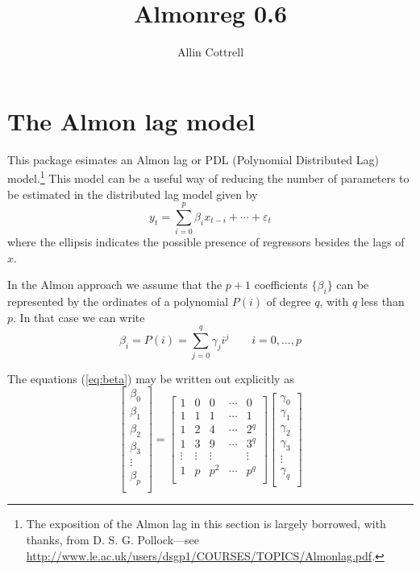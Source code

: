 \documentclass{article}
\begin{document}
\setlength{\parindent}{0pt}
\setlength{\parskip}{1ex}

\title{Almonreg 0.6}
\author{Allin Cottrell}
\maketitle

\section{The Almon lag model}

This package esimates an Almon lag or PDL (Polynomial Distributed Lag)
model.\footnote{The exposition of the Almon lag in this section is
  largely borrowed, with thanks, from D. S. G. Pollock---see
  \url{http://www.le.ac.uk/users/dsgp1/COURSES/TOPICS/Almonlag.pdf}.}
This model can be a useful way of reducing the number of parameters to
be estimated in the distributed lag model given by
%
\begin{equation}
\label{eq:dl}
y_t = \sum_{i=0}^p \beta_i x_{t-i} + \cdots + \varepsilon_t
\end{equation}
%
where the ellipsis indicates the possible presence of regressors
besides the lags of $x$.

In the Almon approach we assume that the $p+1$ coefficients
$\{\beta_i\}$ can be represented by the ordinates of a polynomial
$P(i)$ of degree $q$, with $q$ less than $p$. In that case we can
write
%
\begin{equation}
\label{eq:beta}
\beta_i = P(i) = \sum_{j=0}^q \gamma_j i^j \qquad i=0,\dots,p
\end{equation}

The equations (\ref{eq:beta}) may be written out explicitly as
%
\begin{equation*}
\left[
\begin{array}{c}
\beta_0 \\
\beta_1 \\
\beta_2 \\
\beta_3 \\
\vdots \\
\beta_p \\
\end{array}
\right]
=
\left[
  \begin{array}{ccccc}
1 & 0 & 0 & \cdots & 0 \\
1 & 1 & 1 & \cdots & 1 \\
1 & 2 & 4 & \cdots & 2^q \\
1 & 3 & 9 & \cdots & 3^q \\
\vdots & \vdots & \vdots & & \vdots \\
1 & p & p^2 & \cdots & p^q \\
\end{array}
\right]
\left[
\begin{array}{c}
\gamma_0 \\
\gamma_1 \\
\gamma_2 \\
\gamma_3 \\
\vdots \\
\gamma_q \\
\end{array}
\right]
\end{equation*}
\end{document}
